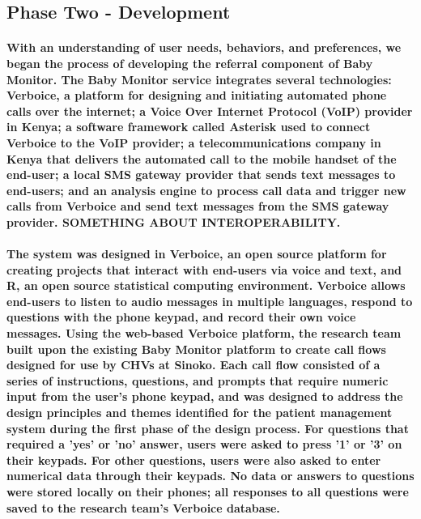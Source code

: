\subsection{Phase Two - Development}
\paragraph{With an understanding of user needs, behaviors, and preferences, we began the process of developing the referral component of Baby Monitor. The Baby Monitor service integrates several technologies: Verboice, a platform for designing and initiating automated phone calls over the internet; a Voice Over Internet Protocol (VoIP) provider in Kenya; a software framework called Asterisk used to connect Verboice to the VoIP provider; a telecommunications company in Kenya that delivers the automated call to the mobile handset of the end-user; a local SMS gateway provider that sends text messages to end-users; and an analysis engine to process call data and trigger new calls from Verboice and send text messages from the SMS gateway provider. SOMETHING ABOUT INTEROPERABILITY.} 

\paragraph{The system was designed in Verboice, an open source platform for creating projects that interact with end-users via voice and text, and R, an open source statistical computing environment. Verboice allows end-users to listen to audio messages in multiple languages, respond to questions with the phone keypad, and  record their own voice messages. Using the web-based Verboice platform, the research team built upon the existing Baby Monitor platform to create call flows designed for use by CHVs at Sinoko. Each call flow consisted of a series of instructions, questions, and prompts that require numeric input from the user's phone keypad, and was designed to address the design principles and themes identified for the patient management system during the first phase of the design process. For questions that required a 'yes' or 'no' answer, users were asked to press '1' or '3' on their keypads. For other questions, users were also asked to enter numerical data through their keypads. No data or answers to questions were stored locally on their phones; all responses to all questions were saved to the research team's Verboice database.} 

